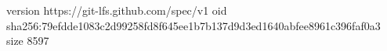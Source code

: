 version https://git-lfs.github.com/spec/v1
oid sha256:79efdde1083c2d99258fd8f645ee1b7b137d9d3ed1640abfee8961c396faf0a3
size 8597
